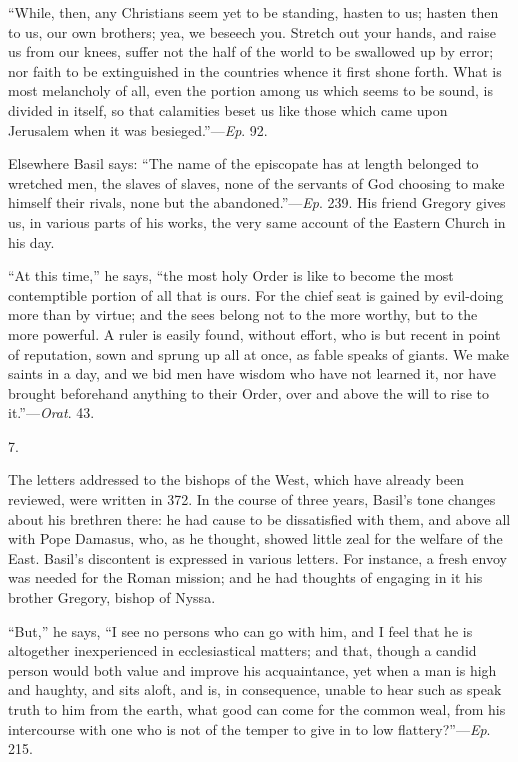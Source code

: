 ``While, then, any Christians seem yet to be standing, hasten
to us; hasten then to us, our own brothers; yea, we beseech you.
Stretch out your hands, and raise us from our knees, suffer not the
half of the world to be swallowed up by error; nor
faith to be extinguished in the countries whence it first shone forth.
What is most melancholy of all, even the portion among us which seems
to be sound, is divided in itself, so that calamities beset us like
those which came upon Jerusalem when it was besieged.''—\emph{Ep}.
92.

Elsewhere Basil says: ``The name of the episcopate has at
length belonged to wretched men, the slaves of slaves, none of the
servants of God choosing to make himself their rivals, none but the
abandoned.''—\emph{Ep}. 239. His friend Gregory gives us, in
various parts of his works, the very same account of the Eastern
Church in his day.

``At this time,'' he says, ``the most holy Order is
like to become the most contemptible portion of all that is ours. For
the chief seat is gained by evil-doing more than by virtue; and the
sees belong not to the more worthy, but to the more powerful. A ruler
is easily found, without effort, who is but recent in point of
reputation, sown and sprung up all at once, as fable speaks of giants.
We make saints in a day, and we bid men have wisdom who have not
learned it, nor have brought beforehand anything to their Order, over
and above the will to rise to it.''—\emph{Orat}. 43.

7.

The letters addressed to the bishops of the West, which have
already been reviewed, were written in 372. In the course of three
years, Basil's tone changes about his brethren there: he had cause to
be dissatisfied with them, and above all with Pope Damasus, who, as he
thought, showed little zeal for the welfare of the East. Basil's
discontent is expressed in various letters. For instance, a fresh
envoy was needed for the Roman mission; and he had thoughts of
engaging in it his brother Gregory, bishop of Nyssa.

``But,'' he says, ``I see no persons who can go with
him, and I feel that he is altogether
inexperienced in ecclesiastical matters; and that, though a candid
person would both value and improve his acquaintance, yet when a man
is high and haughty, and sits aloft, and is, in consequence, unable to
hear such as speak truth to him from the earth, what good can come for
the common weal, from his intercourse with one who is not of the
temper to give in to low flattery?''—\emph{Ep}. 215.

